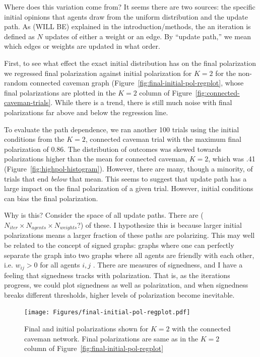 \documentclass[11pt,letterpaper]{article}
\begin{document}
Where does
this variation come from? It seems there are two sources: the specific
initial opinions that agents draw from the uniform distribution and the
update path. As (WILL BE) explained in the introduction/methods, 
the  an iteration is defined as $N$ updates of either a 
weight or an edge.  By ``update path,'' we mean which edges or weights are 
updated in what order. 

First, to see what effect the exact initial distribution has on the final 
polarization we regressed final polarization against initial polarization for
$K=2$ for the non-random connected caveman graph 
(Figure~\ref{fig:final-initial-pol-regplot}, whose final polarizations are 
plotted in the $K=2$ column of Figure~\ref{fig:connected-caveman-trials}.
While there is a trend, there is still much noise with final polarizations
far above and below the regression line. 

To evaluate the path dependence, we ran another 100 trials using the initial
conditions from the $K=2$, connected caveman trial
with the maximum final polarization of 0.86. The distribution of outcomes was
skewed towards polarizations higher than the mean for connected caveman, $K=2$,
which was .41 (Figure~\ref{fig:highpol-histogram}). However, there are many,
though a minority, of trials that end \emph{below} that mean. This seems to
suggest that update path has a large impact on the final polarization of a
given trial. However, initial conditions can bias the final polarization. 

Why is this? Consider the space of all update paths. 
There are ($N_{iter} \times N_{agents} \times N_{weights}$?) of these.
I hypothesize this is because larger initial polarizations means a larger
fraction of these paths are polarizing. This may well be related to the 
concept of signed graphs: graphs where one can perfectly separate the graph
into two graphs where all agents are friendly with each other, i.e. 
$w_{ij} > 0$ for all agents $i,j$ \cite{Altafini2012}. There are measures of
signedness, and I have a feeling that signedness tracks with polarization.
That is, as the iterations progress, we could plot signedness as well as 
polarization, and when signedness breaks different thresholds, higher levels of
polarization become inevitable.

\begin{figure}[h!]
  \centering
    \texttt{[image: Figures/final-initial-pol-regplot.pdf]}
  \caption{Final and initial polarizations shown for $K=2$ with the connected 
    caveman network. Final polarizations are same as in the $K=2$ column of 
    Figure~\ref{fig:final-initial-pol-regplot}}
  \label{fig:average-trial-caveman-over-k}
\end{figure}
\end{document}
